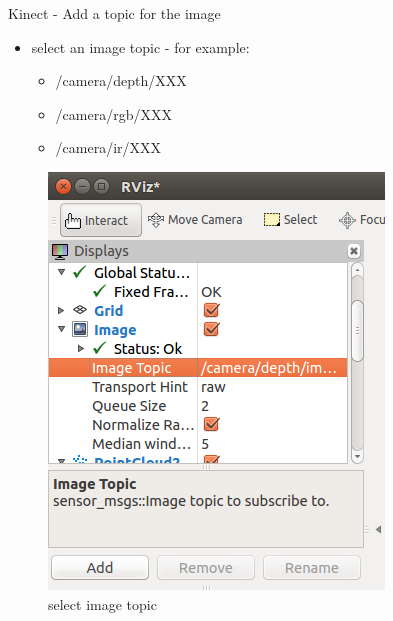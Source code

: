 \documentclass{beamer}
\begin{document}
\begin{frame}{Kinect - Add a topic for the image}	

	\begin{itemize}
		\item select an image topic - for example: \\
			 
			\begin{itemize}
				\item /camera/depth/XXX
				\item /camera/rgb/XXX
				\item /camera/ir/XXX
			\end{itemize}
			
	\end{itemize}

	\begin{figure}[H]
		\includegraphics[scale=0.3]{./Images/Add_Image_Topic.png}
		\caption{select image topic}
		\label{fig:ros_image_topic}
	\end{figure}
		
\end{frame}

\end{document}
